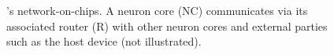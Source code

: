 \begin{figure}[htbp]
    \centering
    \hfill
    \caption{\graicore{}'s network-on-chips. A neuron core (NC) communicates via its associated router (R) with other neuron cores and external parties such as the host device (not illustrated).}
    \label{fig:noc}
\end{figure}


